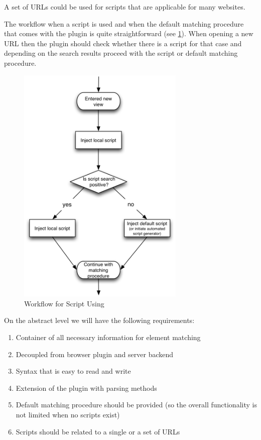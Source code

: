 A set of URLs could be used for scripts that are applicable for many websites. 

The workflow when a script is used and when the default matching procedure that comes with the plugin is quite straightforward (see \figurename \ref{script-usage-basic}). When opening a new URL then the plugin should check whether there is a script for that case and depending on the search results proceed with the script or default matching procedure.

\begin{figure}\centering
		\includegraphics[width=8cm]{images/script-usage-basic.png}
		\caption{Workflow for Script Using}
		\label{script-usage-basic}
\end{figure} 

On the abstract level we will have the following requirements:

\begin{enumerate}
	\item Container of all necessary information for element matching
	\item Decoupled from browser plugin and server backend
	\item Syntax that is easy to read and write
	\item Extension of the plugin with parsing methods
	\item Default matching procedure should be provided (so the overall functionality is not limited when no scripts exist)
	\item Scripts should be related to a single or a set of URLs
\end{enumerate}

